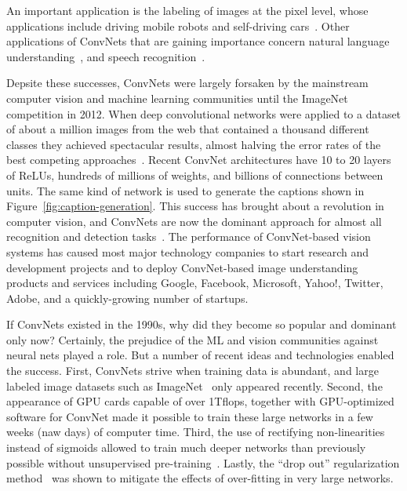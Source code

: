 \documentclass[10pts]{article}
\begin{document}
An important application is the labeling of images at the pixel level,
whose applications include driving mobile robots and self-driving
cars~\cite{hadsell-jfr-09,farabet-icml-12}. Other applications of
ConvNets that are gaining importance concern natural language
understanding~\citep{collobert:2011b}, and speech
recognition~\cite{Sainath-et-al-ICASSP2013}.

Depsite these successes, ConvNets were largely forsaken by the
mainstream computer vision and machine learning communities until the
ImageNet competition in 2012.  When deep convolutional networks were
applied to a dataset of about a million images from the web that
contained a thousand different classes they achieved spectacular
results, almost halving the error rates of the best competing
approaches~\citep{Krizhevsky-2012-small}.  Recent ConvNet
architectures have 10 to 20 layers of ReLUs, hundreds of millions of
weights, and billions of connections between units. The same kind of
network is used to generate the captions shown in
Figure~\ref{fig:caption-generation}. This success has brought about a
revolution in computer vision, and ConvNets are now the dominant
approach for almost all recognition and detection
tasks~\citep{sermanet-iclr-14,girshick-cvpr-2014,taigman-cvpr-2014,simonyan-arxiv-2014,szegedy-2014,Tompson-et-al-arxiv2014}.
The performance of ConvNet-based vision systems has caused most major
technology companies to start research and development projects and to
deploy ConvNet-based image understanding products and services
including Google, Facebook, Microsoft, Yahoo!, Twitter, Adobe, and a
quickly-growing number of startups.

If ConvNets existed in the 1990s, why did they become so popular and
dominant only now? Certainly, the prejudice of the ML and vision
communities against neural nets played a role. But a number of recent
ideas and technologies enabled the success. First, ConvNets strive
when training data is abundant, and large labeled image datasets such
as ImageNet~\citep{imagenet_cvpr09} only appeared recently. Second,
the appearance of GPU cards capable of over 1Tflops, together with
GPU-optimized software for ConvNet made it possible to train these
large networks in a few weeks (naw days) of computer time. Third, the
use of rectifying non-linearities instead of sigmoids allowed to train
much deeper networks than previously possible without unsupervised
pre-training~\cite{jarrett-iccv-09,Glorot+al-AI-2011-small}. Lastly,
the ``drop out'' regularization method~\citep{Srivastava14} was shown
to mitigate the effects of over-fitting in very large networks. 
\end{document}
